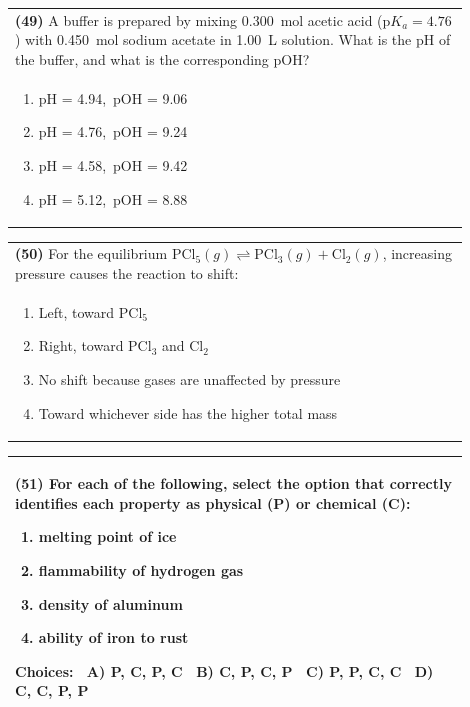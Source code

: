 \documentclass{article}
\begin{document}
\noindent\begin{tabular}{|p{0.9\linewidth}|}
\hline
\textbf{(49)} A buffer is prepared by mixing 0.300~mol acetic acid (p$K_a=4.76$) with 0.450~mol sodium acetate in 1.00~L solution. What is the pH of the buffer, and what is the corresponding pOH?\\[0.2cm]
\begin{minipage}[t]{0.85\linewidth}
\begin{enumerate}[label=\alph*.]
\item pH = 4.94,\ pOH = 9.06
\item pH = 4.76,\ pOH = 9.24
\item pH = 4.58,\ pOH = 9.42
\item pH = 5.12,\ pOH = 8.88
\end{enumerate}
\end{minipage}\\[0.2cm]
\hline
\end{tabular}

\noindent\begin{tabular}{|p{0.9\linewidth}|}
\hline
\textbf{(50)} For the equilibrium $ \text{PCl}_5(g) \rightleftharpoons \text{PCl}_3(g) + \text{Cl}_2(g)$, increasing pressure causes the reaction to shift: \\[0.2cm]
\begin{minipage}[t]{0.85\linewidth}
\begin{enumerate}[label=\alph*.]
\item Left, toward PCl$_5$
\item Right, toward PCl$_3$ and Cl$_2$
\item No shift because gases are unaffected by pressure
\item Toward whichever side has the higher total mass
\end{enumerate}
\end{minipage}\\[0.2cm]
\hline
\end{tabular}

\noindent\begin{tabular}{|p{0.9\linewidth}|}
\hline
\textbf{(51)} For each of the following, select the option that correctly identifies each property as physical (P) or chemical (C): \
\begin{minipage}[t]{0.85\linewidth}
\begin{enumerate}[label=\alph*.]
\item melting point of ice
\item flammability of hydrogen gas
\item density of aluminum
\item ability of iron to rust
\end{enumerate}
\textbf{Choices:} \
A) P, C, P, C \
B) C, P, C, P \
C) P, P, C, C \
D) C, C, P, P
\end{minipage}\\[0.2cm]
\hline
\end{tabular}
\end{document}
